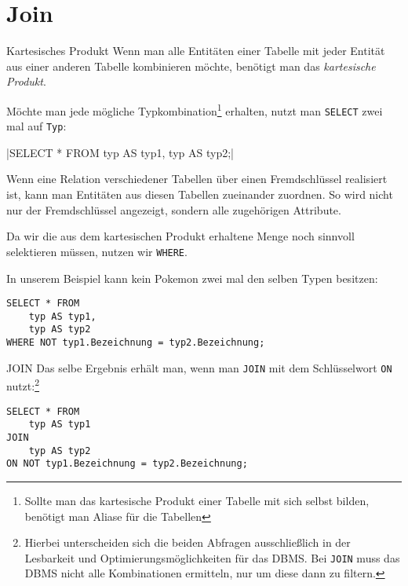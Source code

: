 \section{Join}

\begin{defi}{Kartesisches Produkt}
    Wenn man alle Entitäten einer Tabelle mit jeder Entität aus einer anderen Tabelle kombinieren möchte, benötigt man das \emph{kartesische Produkt}.

    Möchte man jede mögliche Typkombination\footnote{Sollte man das kartesische Produkt einer Tabelle mit sich selbst bilden, benötigt man Aliase für die Tabellen} erhalten, nutzt man \texttt{SELECT} zwei mal auf \texttt{Typ}:

    |SELECT * FROM typ AS typ1, typ AS typ2;|

    

    Wenn eine Relation verschiedener Tabellen über einen Fremdschlüssel realisiert ist, kann man Entitäten aus diesen Tabellen zueinander zuordnen.
    So wird nicht nur der Fremdschlüssel angezeigt, sondern alle zugehörigen Attribute.
    
    Da wir die aus dem kartesischen Produkt erhaltene Menge noch sinnvoll selektieren müssen, nutzen wir \texttt{WHERE}.

    In unserem Beispiel kann kein Pokemon zwei mal den selben Typen besitzen:

    \begin{verbatim}
SELECT * FROM
    typ AS typ1,
    typ AS typ2
WHERE NOT typ1.Bezeichnung = typ2.Bezeichnung;
    \end{verbatim}

    
\end{defi}

\begin{sql}{JOIN}
    Das selbe Ergebnis erhält man, wenn man \texttt{JOIN} mit dem Schlüsselwort \texttt{ON} nutzt:\footnote{
        Hierbei unterscheiden sich die beiden Abfragen ausschließlich in der Lesbarkeit und Optimierungsmöglichkeiten für das DBMS.
        Bei \texttt{JOIN} muss das DBMS nicht alle Kombinationen ermitteln, nur um diese dann zu filtern.
    }

    \begin{verbatim}
SELECT * FROM
    typ AS typ1
JOIN
    typ AS typ2
ON NOT typ1.Bezeichnung = typ2.Bezeichnung;
    \end{verbatim}
\end{sql}

